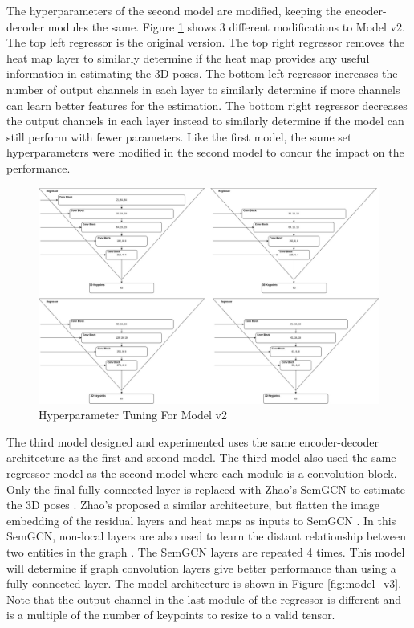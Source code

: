 \newpage

\noindent
The hyperparameters of the second model are modified, keeping the encoder-decoder modules the same. Figure \ref{fig:model_v2_x} shows 3 different modifications to Model v2. The top left regressor is the original version. The top right regressor removes the heat map layer to similarly determine if the heat map provides any useful information in estimating the 3D poses. The bottom left regressor increases the number of output channels in each layer to similarly determine if more channels can learn better features for the estimation. The bottom right regressor decreases the output channels in each layer instead to similarly determine if the model can still perform with fewer parameters. Like the first model, the same set hyperparameters were modified in the second model to concur the impact on the performance.

\begin{figure}[ht]
	\begin{center}
		\includegraphics[width=450px]{assets/Model_v2.x.jpg}
		\caption{Hyperparameter Tuning For Model v2}
		\label{fig:model_v2_x}
	\end{center}
\end{figure}

\newpage

\noindent
The third model designed and experimented uses the same encoder-decoder architecture as the first and second model. The third model also used the same regressor model as the second model where each module is a convolution block. Only the final fully-connected layer is replaced with Zhao's SemGCN to estimate the 3D poses \cite{semgcn}. Zhao's proposed a similar architecture, but flatten the image embedding of the residual layers and heat maps as inputs to SemGCN \cite{semgcn}. In this SemGCN, non-local layers are also used to learn the distant relationship between two entities in the graph \cite{semgcn, nonlocal}. The SemGCN layers are repeated 4 times. This model will determine if graph convolution layers give better performance than using a fully-connected layer. The model architecture is shown in Figure \ref{fig:model_v3}. Note that the output channel in the last module of the regressor is different and is a multiple of the number of keypoints to resize to a valid tensor.

